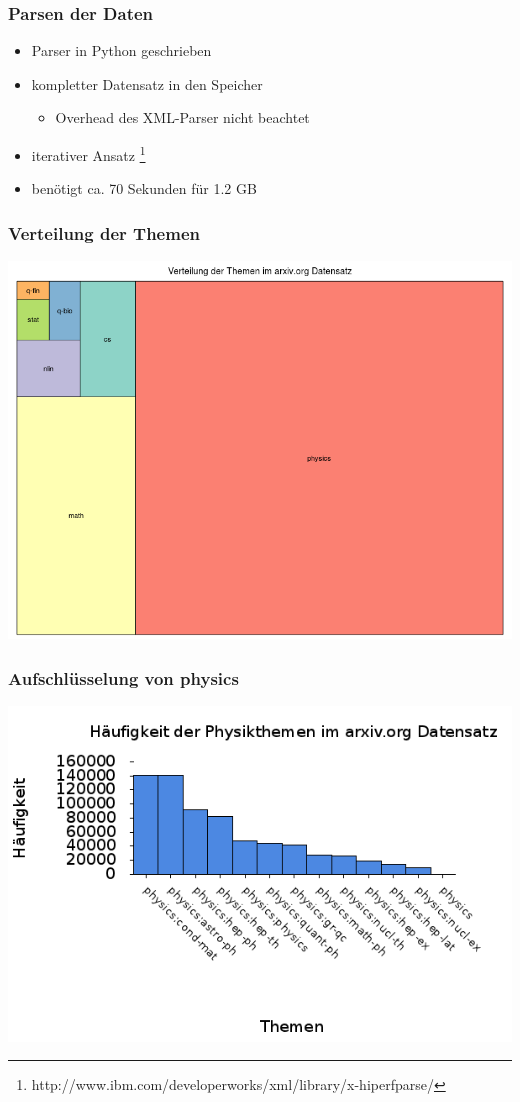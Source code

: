 \documentclass[12pt, xcolor=table]{beamer}
\begin{document}
\begin{frame}
	\frametitle{Parsen der Daten}
	\begin{itemize}
		\item  Parser in Python geschrieben 
		\item  kompletter Datensatz in den Speicher
			\begin{itemize}
				\item Overhead des XML-Parser nicht beachtet
			\end{itemize}
		\item iterativer Ansatz \footnote{http://www.ibm.com/developerworks/xml/library/x-hiperfparse/}
		\item benötigt ca. 70 Sekunden für 1.2 GB
	\end{itemize}
\end{frame}
\begin{frame}
	\frametitle{Verteilung der Themen}
	\begin{center}
		\includegraphics[scale=0.35]{../visual/treeParent.png}
	\end{center}
\end{frame}
\begin{frame}
	\frametitle{Aufschlüsselung von physics}
	\begin{center}
		\includegraphics[scale=0.45]{../visual/setSpecFreq.png}
	\end{center}
\end{frame}
\end{document}
